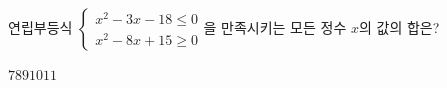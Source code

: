 \hspace*{2mm}\begin{minipage}[t]{\dimexpr\linewidth-2mm\relax}\vspace{0pt}
연립부등식 $\begin{cases} x^2-3x-18\le 0 \\ x^2-8x+15\ge 0 \end{cases}$을 만족시키는 모든 정수 $x$의 값의 합은?
\begin{choices32}{$7$}{$8$}{$9$}{$10$}{$11$}\end{choices32}\end{minipage}
